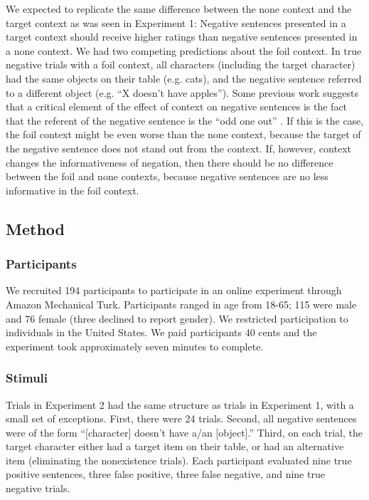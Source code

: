 \documentclass[10pt,letterpaper]{article}
\begin{document}
We expected to replicate the same difference between the none context and the target context as was seen in Experiment 1: Negative sentences presented in a target context should receive higher ratings than negative sentences presented in a none context.  We had two competing predictions about the foil context.
In true negative trials with a foil context, all characters (including the target character) had the same objects on their table (e.g. cats), and the negative sentence referred to a different object (e.g. ``X doesn't have apples'').  Some previous work suggests that a critical element of the effect of context on negative sentences is the fact that the referent of the negative sentence is the ``odd one out'' \cite{wason1965}.  If this is the case, the foil context might be even worse than the none context, because the target of the negative sentence does not stand out from the context.  If, however, context changes the informativeness of negation, then there should be no difference between the foil and none contexts, because negative sentences are no less informative in the foil context.  

\subsection{Method}

\subsubsection{Participants}

We recruited 194 participants to participate in an online experiment through Amazon Mechanical Turk.  Participants ranged in age from 18-65; 115 were male and 76 female (three declined to report gender).  We restricted participation to individuals in the United States. We paid participants 40 cents and the experiment took approximately seven minutes to complete.  

\subsubsection{Stimuli}

Trials in Experiment 2 had the same structure as trials in Experiment 1, with a small set of exceptions. First, there were 24 trials. Second, all negative sentences were of the form ``[character] doesn't have a/an [object].'' Third, on each trial, the target character either had a target item on their table, or had an alternative item (eliminating the nonexistence trials).  Each participant evaluated nine true positive sentences, three false positive, three false negative, and nine true negative trials.
\end{document}
